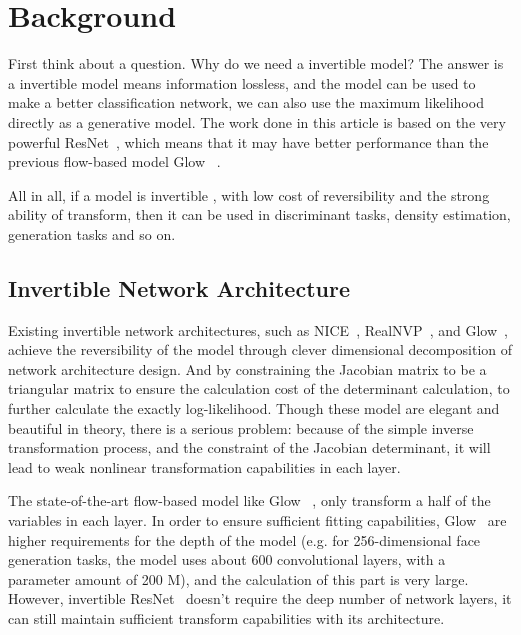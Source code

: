 \documentclass[final]{cvpr}
\begin{document}
\section{Background}
First think about a question. Why do we need a invertible  model? The answer is a invertible model means information lossless, and the model can be used to make a better classification network, we can also use the maximum likelihood directly as a generative model. The work done in this article is based on the very powerful ResNet~\cite{he2016deep}, which means that it may have better performance than the previous flow-based model Glow~\cite{kingma2018glow} .

All in all, if a model is invertible , with low cost of reversibility and the strong ability of transform, then it can be used in discriminant tasks, density estimation, generation tasks and so on.

\subsection{Invertible Network Architecture}
Existing invertible network architectures, such as NICE~\cite{dinh2014nice}, RealNVP~\cite{dinh2016density}, and Glow~\cite{kingma2018glow}, achieve the reversibility of the model through clever dimensional decomposition of network architecture design. And by constraining the Jacobian matrix to be a triangular matrix to ensure the calculation cost of the determinant calculation, to further calculate the exactly log-likelihood. Though these model are elegant and beautiful in theory, there is a serious problem: because of the simple inverse transformation process, and the constraint of the Jacobian determinant, it will lead to weak nonlinear transformation capabilities in each layer.

The state-of-the-art flow-based model like Glow~\cite{kingma2018glow} , only transform a half of the variables in each layer. In order to ensure sufficient fitting capabilities, Glow~\cite{kingma2018glow} are higher requirements for the depth of the model (e.g. for 256-dimensional face generation tasks, the model uses about 600 convolutional layers, with a parameter amount of 200 M), and the calculation of this part is very large. However, invertible ResNet~\cite{behrmann2019invertible} doesn't require the deep number of network layers, it can still maintain sufficient transform capabilities with its architecture.
\end{document}
